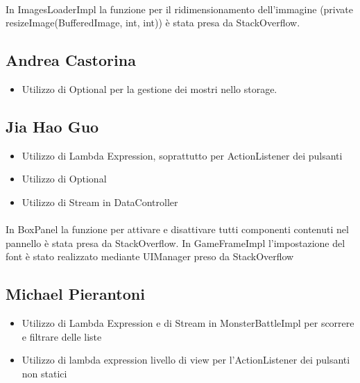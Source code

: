 \paragraph{}
In ImagesLoaderImpl la funzione per il ridimensionamento dell'immagine (private resizeImage(BufferedImage, int, int)) è stata presa da StackOverflow. 

\subsection*{Andrea Castorina}
\begin{itemize}
    \item Utilizzo di Optional per la gestione dei mostri nello storage.
\end{itemize}


\subsection*{Jia Hao Guo}
\begin{itemize}
     \item Utilizzo di Lambda Expression, soprattutto per ActionListener dei pulsanti
     \item Utilizzo di Optional
      \item Utilizzo di Stream in DataController
\end{itemize}
\paragraph{}
In BoxPanel la funzione per attivare e disattivare tutti componenti contenuti 
nel pannello è stata presa da StackOverflow. 
\newline
In GameFrameImpl l'impostazione del font è stato realizzato mediante UIManager preso da StackOverflow


\subsection*{Michael Pierantoni}
\begin{itemize}
    \item Utilizzo di Lambda Expression e di Stream in MonsterBattleImpl per scorrere e filtrare delle liste
    \item Utilizzo di lambda expression livello di view  per l'ActionListener dei pulsanti non statici
\end{itemize}

